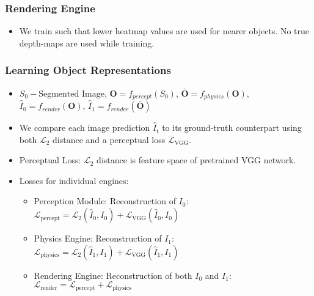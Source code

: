 \documentclass{article}
\begin{document}
    \subsubsection{Rendering Engine}\label{subsubsec:Reasoning_about_Physical_Interactions_with_Object_Oriented_Prediction_and_Planning_(O2P2):rendering-engine}
    \begin{itemize}
        \item We train such that lower heatmap values are used for nearer objects.
        No true depth-maps are used while training.
    \end{itemize}

    \subsubsection{Learning Object Representations}\label{subsubsec:Reasoning_about_Physical_Interactions_with_Object_Oriented_Prediction_and_Planning_(O2P2):learning-object-representations}
    \begin{itemize}
        \item $S_0 - \textrm{Segmented Image}$, $\textbf{O}  = f_{percept}(S_0)$, $\bar{\textbf{O}} = f_{physics}(\textbf{O})$, $\hat{I}_0 = f_{render}(\textbf{O})$, $\hat{I}_1 = f_{render}(\bar{\textbf{O}})$
        \item We compare each image prediction $\hat{I}_t$ to its ground-truth counterpart using both $\mathcal{L}_2$ distance and a perceptual loss $\mathcal{L}_{\textrm{VGG}}$.
        \item Perceptual Loss: $\mathcal{L}_2$ distance is feature space of pretrained VGG network.
        \item Losses for individual engines:
        \begin{itemize}
            \item Perception Module: Reconstruction of $I_0$: $\mathcal{L}_{\textrm{percept}} = \mathcal{L}_2(\hat{I}_0, I_0) + \mathcal{L}_{\textrm{VGG}}(\hat{I}_0, I_0)$
            \item Physics Engine: Reconstruction of $I_1$: $\mathcal{L}_{\textrm{physics}} = \mathcal{L}_2(\hat{I}_1, I_1) + \mathcal{L}_{\textrm{VGG}}(\hat{I}_1, I_1)$
            \item Rendering Engine: Reconstruction of both $I_0$ and $I_1$: $\mathcal{L}_{\textrm{render}} = \mathcal{L}_{\textrm{percept}} + \mathcal{L}_{\textrm{physics}}$
        \end{itemize}
    \end{itemize}
\end{document}
